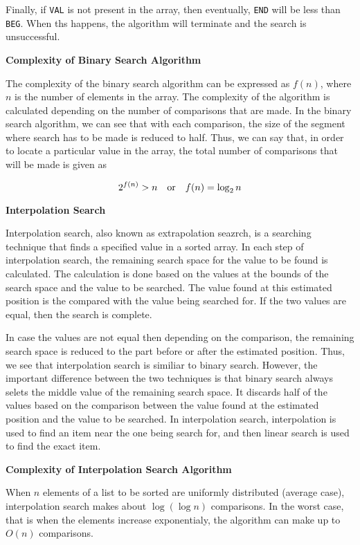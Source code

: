 \vskip 3mm
Finally, if {\tt VAL} is not present in the array, then eventually, {\tt END} will be less than {\tt BEG}. When ths happens, the algorithm will terminate and the search is unsuccessful.

\vskip 3mm
{\bf Complexity of Binary Search Algorithm}

\vskip 1mm
The complexity of the binary search algorithm can be expressed as $f(n)$, where $n$ is the number of elements in the array. The complexity of the algorithm is calculated depending on the number of comparisons that are made. In the binary search algorithm, we can see that with each comparison, the size of the segment where search has to be made is reduced to half. Thus, we can say that, in order to locate a particular value in the array, the total number of comparisons that will be made is given as

$$2^{f(n)}>n\quad\hbox{or}\quad f(n) = \log_2 n$$

\filbreak
\vskip 1cm
{\bf Interpolation Search}

\vskip 1mm
Interpolation search, also known as extrapolation seazrch, is a searching technique that finds a specified value in a sorted array. In each step of interpolation search, the remaining search space for the value to be found is calculated. The calculation is done based on the values at the bounds of the search space and the value to be searched. The value found at this estimated position is the compared with the value being searched for. If the two values are equal, then the search is complete.


\vskip 1mm
In case the values are not equal then depending on the comparison, the remaining search space is reduced to the part before or after the estimated position. Thus, we see that interpolation search is similiar to binary search. However, the important difference between the two techniques is that binary search always selets the middle value of the remaining search space. It discards half of the values based on the comparison between the value found at the estimated position and the value to be searched. In interpolation search, interpolation is used to find an item near the one being search for, and then linear search is used to find the exact item.

\vskip 3mm
{\bf Complexity of Interpolation Search Algorithm}

\vskip 1mm
When $n$ elements of a list to be sorted are uniformly distributed (average case), interpolation search makes about $\log(\log n)$ comparisons. In the worst case, that is when the elements increase exponentialy, the algorithm can make up to $O(n)$ comparisons.

